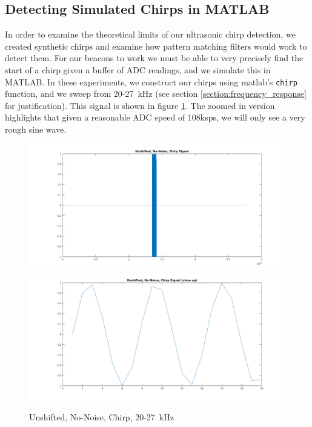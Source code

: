 \documentclass{article}
\begin{document}

  \subsection{Detecting Simulated Chirps in MATLAB}

    In order to examine the theoretical limits of our ultrasonic chirp detection, we created synthetic chirps and examine how pattern matching filters would work to detect them. For our beacons to work we must be able to very precisely find the start of a chirp given a buffer of ADC readings, and we simulate this in MATLAB. In these experiments, we construct our chirps using matlab's \texttt{chirp} function, and we sweep from 20-27\SI{}{\kilo\hertz} (see section \ref{section:frequency_response} for justification). This signal is shown in figure \ref{fig:unshifted_no_noise_chirp}. The zoomed in version highlights that given a reasonable ADC speed of 108ksps, we will only see a very rough sine wave.

    \begin{figure}[H]
      \centering
      \includegraphics[width=1\linewidth]{./images/unshifted_no_noise_chirp.png}
      \includegraphics[width=1\linewidth]{./images/unshifted_no_noise_chirp_zoomed.png}
      \caption{Unshifted, No-Noise, Chirp, 20-27\SI{}{\kilo\hertz}}
      \label{fig:unshifted_no_noise_chirp}
    \end{figure}
\end{document}
